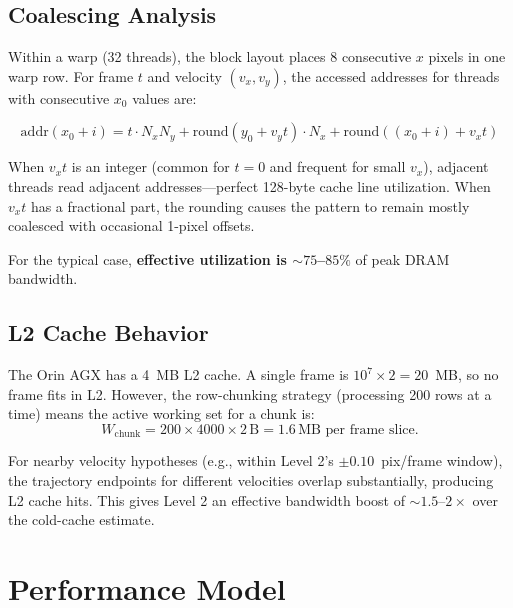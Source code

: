 \documentclass[11pt,letterpaper]{article}
\begin{document}
\subsection{Coalescing Analysis}

Within a warp (32 threads), the block layout places 8 consecutive $x$
pixels in one warp row. For frame $t$ and velocity $(v_x, v_y)$, the
accessed addresses for threads with consecutive $x_0$ values are:

\begin{equation}
    \text{addr}(x_0 + i) = t \cdot N_x N_y + \mathrm{round}(y_0 + v_y t) \cdot N_x
    + \mathrm{round}((x_0 + i) + v_x t)
\end{equation}

When $v_x t$ is an integer (common for $t=0$ and frequent for small $v_x$),
adjacent threads read adjacent addresses---perfect 128-byte cache line
utilization. When $v_x t$ has a fractional part, the rounding causes
the pattern to remain mostly coalesced with occasional 1-pixel offsets.

For the typical case, \textbf{effective utilization is ${\sim}75$--$85\%$}
of peak DRAM bandwidth.

\subsection{L2 Cache Behavior}

The Orin AGX has a 4~MB L2 cache. A single frame is $10^7 \times 2 = 20$~MB,
so no frame fits in L2. However, the row-chunking strategy (processing
200 rows at a time) means the active working set for a chunk is:
\begin{equation}
    W_{\text{chunk}} = 200 \times 4000 \times 2\,\text{B} = 1.6\,\text{MB per frame slice.}
\end{equation}

For nearby velocity hypotheses (e.g., within Level 2's $\pm 0.10$~pix/frame
window), the trajectory endpoints for different velocities overlap
substantially, producing L2 cache hits. This gives Level 2 an effective
bandwidth boost of ${\sim}1.5$--$2\times$ over the cold-cache estimate.


\section{Performance Model}
\label{sec:performance}
\end{document}
